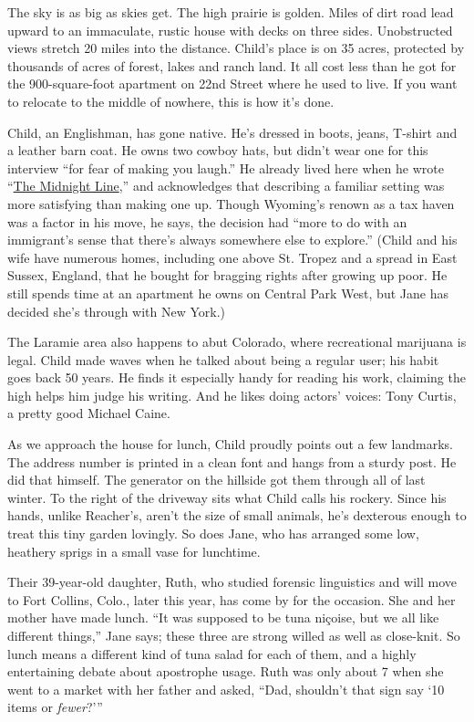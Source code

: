 The sky is as big as skies get. The high prairie is golden. Miles of
dirt road lead upward to an immaculate, rustic house with decks on three
sides. Unobstructed views stretch 20 miles into the distance. Child's
place is on 35 acres, protected by thousands of acres of forest, lakes
and ranch land. It all cost less than he got for the 900-square-foot
apartment on 22nd Street where he used to live. If you want to relocate
to the middle of nowhere, this is how it's done.

Child, an Englishman, has gone native. He's dressed in boots, jeans,
T-shirt and a leather barn coat. He owns two cowboy hats, but didn't
wear one for this interview ``for fear of making you laugh.'' He already
lived here when he wrote
``\href{https://www.nytimes3xbfgragh.onion/2017/11/08/books/review-midnight-line-jack-reacher-lee-child.html}{The
Midnight Line},'' and acknowledges that describing a familiar setting
was more satisfying than making one up. Though Wyoming's renown as a tax
haven was a factor in his move, he says, the decision had ``more to do
with an immigrant's sense that there's always somewhere else to
explore.'' (Child and his wife have numerous homes, including one above
St. Tropez and a spread in East Sussex, England, that he bought for
bragging rights after growing up poor. He still spends time at an
apartment he owns on Central Park West, but Jane has decided she's
through with New York.)

The Laramie area also happens to abut Colorado, where recreational
marijuana is legal. Child made waves when he talked about being a
regular user; his habit goes back 50 years. He finds it especially handy
for reading his work, claiming the high helps him judge his writing. And
he likes doing actors' voices: Tony Curtis, a pretty good Michael Caine.

As we approach the house for lunch, Child proudly points out a few
landmarks. The address number is printed in a clean font and hangs from
a sturdy post. He did that himself. The generator on the hillside got
them through all of last winter. To the right of the driveway sits what
Child calls his rockery. Since his hands, unlike Reacher's, aren't the
size of small animals, he's dexterous enough to treat this tiny garden
lovingly. So does Jane, who has arranged some low, heathery sprigs in a
small vase for lunchtime.

Their 39-year-old daughter, Ruth, who studied forensic linguistics and
will move to Fort Collins, Colo., later this year, has come by for the
occasion. She and her mother have made lunch. ``It was supposed to be
tuna niçoise, but we all like different things,'' Jane says; these three
are strong willed as well as close-knit. So lunch means a different kind
of tuna salad for each of them, and a highly entertaining debate about
apostrophe usage. Ruth was only about 7 when she went to a market with
her father and asked, ``Dad, shouldn't that sign say `10 items or
\emph{fewer}?'''

